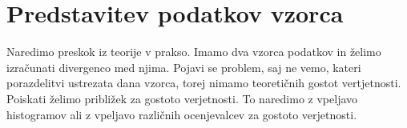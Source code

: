 \section{Predstavitev podatkov vzorca}

Naredimo preskok iz teorije v prakso. Imamo dva vzorca podatkov in želimo izračunati divergenco med njima. Pojavi se problem, saj ne vemo, kateri porazdelitvi ustrezata dana vzorca, torej nimamo teoretičnih gostot vertjetnosti. Poiskati želimo približek za gostoto verjetnosti. To naredimo z vpeljavo histogramov ali z vpeljavo različnih ocenjevalcev za gostoto verjetnosti.


\pagebreak

\pagebreak

\pagebreak

\pagebreak

\pagebreak

